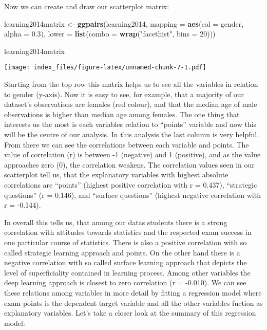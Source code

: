 \documentclass[]{article}
\newenvironment{Shaded}{\begin{snugshade}}{\end{snugshade}}
\newcommand{\KeywordTok}[1]{\textcolor[rgb]{0.13,0.29,0.53}{\textbf{#1}}}
\newcommand{\DataTypeTok}[1]{\textcolor[rgb]{0.13,0.29,0.53}{#1}}
\newcommand{\DecValTok}[1]{\textcolor[rgb]{0.00,0.00,0.81}{#1}}
\newcommand{\FloatTok}[1]{\textcolor[rgb]{0.00,0.00,0.81}{#1}}
\newcommand{\StringTok}[1]{\textcolor[rgb]{0.31,0.60,0.02}{#1}}
\newcommand{\NormalTok}[1]{#1}
\begin{document}
Now we can create and draw our scatterplot matrix:

\begin{Shaded}
\begin{Highlighting}[]
\NormalTok{learning2014matrix <-}\StringTok{ }\KeywordTok{ggpairs}\NormalTok{(learning2014, }\DataTypeTok{mapping =} \KeywordTok{aes}\NormalTok{(}\DataTypeTok{col =}\NormalTok{ gender, }\DataTypeTok{alpha =} \FloatTok{0.3}\NormalTok{), }\DataTypeTok{lower =} \KeywordTok{list}\NormalTok{(}\DataTypeTok{combo =} \KeywordTok{wrap}\NormalTok{(}\StringTok{"facethist"}\NormalTok{, }\DataTypeTok{bins =} \DecValTok{20}\NormalTok{)))}

\NormalTok{learning2014matrix}
\end{Highlighting}
\end{Shaded}

\texttt{[image: index\_files/figure-latex/unnamed-chunk-7-1.pdf]}

Starting from the top row this matrix helps us to see all the variables
in relation to gender (y-axis). Now it is easy to see, for example, that
a majority of our dataset's observations are females (red colour), and
that the median age of male observations is higher than median age among
females. The one thing that interests us the most is each variables
relation to ``points'' variable and now this will be the centre of our
analysis. In this analysis the last column is very helpful. From there
we can see the correlations between each variable and points. The value
of correlation (r) is between -1 (negative) and 1 (positive), and as the
value approaches zero (0), the correlation weakens. The correlation
values seen in our scatterplot tell us, that the explanatory variables
with highest absolute correlations are ``points'' (highest positive
correlation with r = 0.437), ``strategic questions'' (r = 0.146), and
``surface questions'' (highest negative correlation with r = -0.144).

In overall this tells us, that among our datas students there is a
strong correlation with attitudes towards statistics and the respected
exam success in one particular course of statistics. There is also a
positive correlation with so called strategic learning approach and
points. On the other hand there is a negative correlation with so called
surface learning approach that depicts the level of superficiality
contained in learning process. Among other variables the deep learning
approach is closest to zero correlation (r = -0.010). We can see these
relations among variables in more detail by fitting a regression model
where exam points is the dependent target variable and all the other
variables fuction as explanatory variables. Let's take a closer look at
the summary of this regression model:
\end{document}

